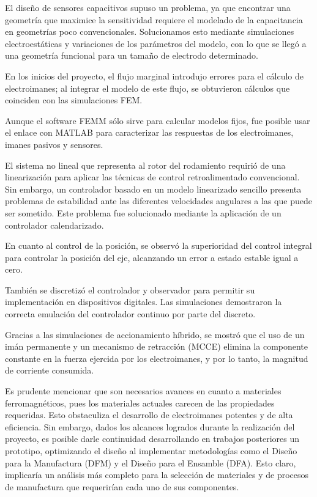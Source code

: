 El dise\~no de sensores capacitivos supuso un problema, ya que encontrar una geometr\'ia que maximice la sensitividad requiere el modelado de la capacitancia en geometr\'ias poco convencionales. Solucionamos esto mediante simulaciones electroest\'aticas y variaciones de los par\'ametros del modelo, con lo que se lleg\'o a una geometr\'ia funcional para un tama\~no de electrodo determinado.

En los inicios del proyecto, el flujo marginal introdujo errores para el c\'alculo de electroimanes; al integrar el modelo de este flujo, se obtuvieron c\'alculos que coinciden con las simulaciones FEM.

Aunque el software FEMM s\'olo sirve para calcular modelos fijos, fue posible usar el enlace con MATLAB para caracterizar las respuestas de los electroimanes, imanes pasivos y sensores.

El sistema no lineal que representa al rotor del rodamiento requiri\'o de una linearizaci\'on para aplicar las t\'ecnicas de control retroalimentado convencional. Sin embargo, un controlador basado en un modelo linearizado sencillo presenta problemas de estabilidad ante las diferentes velocidades angulares a las que puede ser sometido. Este problema fue solucionado mediante la aplicaci\'on de un controlador calendarizado.

En cuanto al control de la posici\'on, se observ\'o la superioridad del control integral para controlar la posici\'on del eje, alcanzando un error a estado estable igual a cero.

Tambi\'en se discretiz\'o el controlador y observador para permitir su implementaci\'on en dispositivos digitales. Las simulaciones demostraron la correcta emulaci\'on del controlador continuo por parte del discreto.

Gracias a las simulaciones de accionamiento h\'ibrido, se mostr\'o que el uso de un im\'an permanente y un mecanismo de retracci\'on (MCCE) elimina la componente constante en la fuerza ejercida por los electroimanes, y por lo tanto, la magnitud de corriente consumida.

Es prudente mencionar que son necesarios avances en cuanto a materiales ferromagn\'eticos, pues los materiales actuales carecen de las propiedades requeridas. Esto obstaculiza el desarrollo de electroimanes potentes y de alta eficiencia. Sin embargo, dados los alcances logrados durante la realizaci\'on del proyecto, es posible darle continuidad desarrollando en trabajos posteriores un prototipo, optimizando el dise\~no al implementar metodolog\'ias como el Dise\~no para la Manufactura (DFM) y el Dise\~no para el Ensamble (DFA). Esto claro, implicar\'ia un an\'alisis m\'as completo para la selecci\'on de materiales y de procesos de manufactura que requerir\'ian cada uno de sus componentes. 
